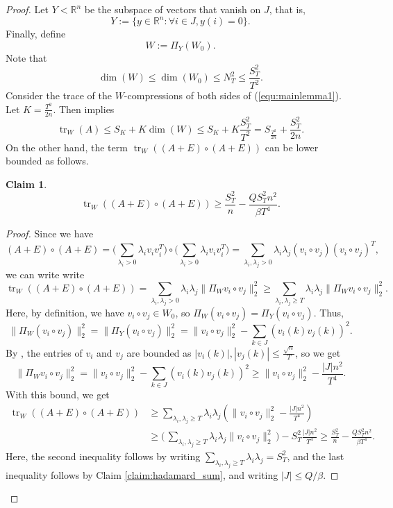 \documentclass[11pt]{article}
\theoremstyle{plain}
\newtheorem{claim}[theorem]{Claim}
\theoremstyle{definition}
\DeclareMathOperator{\trace}{tr}
\begin{document}
\begin{proof}
Let $Y<\mathbb{R}^n$ be the subspace of vectors that vanish on $J$, that is, 
$$Y:=\{y\in\mathbb{R}^n:\forall i\in J, y(i)=0\}.$$ Finally, define $$W:=\Pi_Y(W_0).$$
Note that $$\dim(W)\leq \dim(W_0)\leq N_T^2\leq \frac{S_T^2}{T^2}.$$
Consider the trace of the $W$-compressions of both sides of (\ref{equ:mainlemma1}). 
Let $K=\frac{T^2}{2n}$. 
Then  implies
$$\trace_W(A)\leq S_K+K\dim(W)\leq S_{K}+K\frac{S_T^2}{T^2}= S_{\frac{T^2}{2n}}+\frac{S_T^2}{2n}.$$
On the other hand, the term $\trace_W((A+E)\circ (A+E))$ can be lower bounded as follows.
\begin{claim}
    \[\trace_W((A+E)\circ (A+E))\geq \frac{S_T^2}{n}-\frac{Q  S_T^2 n^2}{\beta T^4}.\]    
\end{claim}
\begin{proof}
Since we have 
\begin{equation*}
(A+E)\circ (A+E)=  \bigg(\sum_{\lambda_i>0}\lambda_iv_iv_i^T\bigg)\circ \bigg(\sum_{\lambda_i>0}\lambda_iv_iv_i^T\bigg) =\sum_{\lambda_i,\lambda_j>0}\lambda_i\lambda_j (v_i\circ v_j)(v_i\circ v_j)^T,
\end{equation*}
we can write write
$$\trace_W((A+E)\circ (A+E))=\sum_{\lambda_i,\lambda_j>0} \lambda_i\lambda_j \|\Pi_W v_i\circ v_j\|_2^2\geq \sum_{\lambda_i,\lambda_j\geq T} \lambda_i\lambda_j \|\Pi_W v_i\circ v_j\|_2^2.$$
Here, by definition, we have $v_i\circ v_j\in W_0$, so $\Pi_W (v_i\circ v_j)=\Pi_Y (v_i\circ v_j)$. Thus,
$$\|\Pi_W (v_i\circ v_j)\|_2^2=\|\Pi_Y (v_i\circ v_j)\|_2^2=\|v_i\circ v_j\|_2^2-\sum_{k\in J} (v_i(k)v_j(k))^2.$$
By , the entries of $v_i$ and $v_j$ are bounded as $|v_i(k)|,|v_j(k)|\leq \frac{\sqrt{n}}{T}$, so we get
$$\big\|\Pi_W v_i\circ v_j \big\|_2^2
    =\|v_i\circ v_j\|_2^2-\sum_{k\in J} (v_i(k)v_j(k))^2
    \geq \|v_i\circ v_j\|_2^2-\frac{|J|n^2}{T^4}.$$
With this bound, we get 
\begin{align*}
    \trace_W((A+E)\circ (A+E))&\geq \sum_{\lambda_i,\lambda_j\geq T} \lambda_i\lambda_j\left(\|v_i\circ v_j\|_2^2-\frac{|J|n^2}{T^4}\right)\\
    &\geq \bigg(\,\sum_{\lambda_i,\lambda_j\geq T}\lambda_i\lambda_j\|v_i\circ v_j\|_2^2\,\bigg)-S_T^2\frac{|J|n^2}{T^4}
    \geq  \frac{S_T^2}{n}-\frac{Q  S_T^2 n^2}{\beta T^4}.
\end{align*}
Here, the second inequality follows by writing $\sum_{\lambda_i,\lambda_j\geq T}\lambda_i\lambda_j=S_T^2$, and the last inequality follows by Claim \ref{claim:hadamard_sum}, and writing  $|J|\leq Q/\beta$.
\end{proof}


\end{proof}
\end{document}
